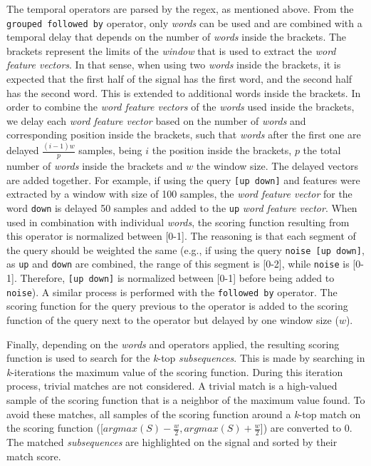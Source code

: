 The temporal operators are parsed by the \gls{regex}, as mentioned above. From the \texttt{grouped followed by} operator, only \textit{words} can be used and are combined with a temporal delay that depends on the number of \textit{words} inside the brackets. The brackets represent the limits of the \textit{window} that is used to extract the \textit{word feature vectors}. In that sense, when using two \textit{words} inside the brackets, it is expected that the first half of the signal has the first word, and the second half has the second word. This is extended to additional words inside the brackets. In order to combine the \textit{word feature vectors} of the \textit{words} used inside the brackets, we delay each \textit{word feature vector} based on the number of \textit{words} and corresponding position inside the brackets, such that \textit{words} after the first one are delayed $\frac{(i-1)w}{p}$ samples, being $i$ the position inside the brackets, $p$ the total number of \textit{words} inside the brackets and $w$ the window size. The delayed vectors are added together. For example, if using the query \texttt{[up down]} and features were extracted by a window with size of 100 samples, the \textit{word feature vector} for the word \texttt{down} is delayed 50 samples and added to the \texttt{up} \textit{word feature vector}. When used in combination with individual \textit{words}, the scoring function resulting from this operator is normalized between [0-1]. The reasoning is that each segment of the query should be weighted the same (e.g., if using the query \texttt{noise [up down]}, as \texttt{up} and \texttt{down} are combined, the range of this segment is [0-2], while \texttt{noise} is [0-1]. Therefore, \texttt{[up down]} is normalized between [0-1] before being added to \texttt{noise}). A similar process is performed with the \texttt{followed by} operator. The scoring function for the query previous to the operator is added to the scoring function of the query next to the operator but delayed by one window size ($w$).
\par
Finally, depending on the \textit{words} and operators applied, the resulting scoring function is used to search for the \textit{k}-top \textit{subsequences}. This is made by searching in \textit{k}-iterations the maximum value of the scoring function. During this iteration process, trivial matches are not considered. A trivial match is a high-valued sample of the scoring function that is a neighbor of the maximum value found. To avoid these matches, all samples of the scoring function around a \textit{k}-top match on the scoring function ([$argmax(S)-\frac{w}{2}, argmax(S)+\frac{w}{2}$]) are converted to $0$. The matched \textit{subsequences} are highlighted on the signal and sorted by their match score.